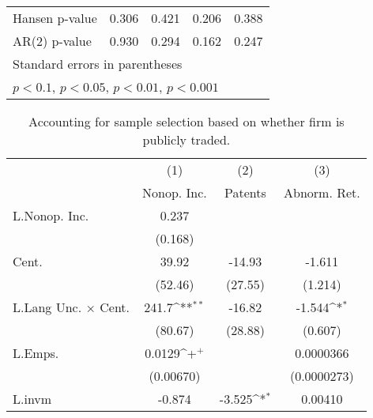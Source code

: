 \begin{table}
\begin{center}
{\begin{tabular}{l*{4}{c}}
Hansen p-value             &       0.306         &       0.421         &       0.206         &       0.388         \\
AR(2) p-value                &       0.930         &       0.294         &       0.162         &       0.247         \\
\hline\hline
\multicolumn{5}{l}{\footnotesize Standard errors in parentheses}\\
\multicolumn{5}{l}{\footnotesize \sym{+} \(p<0.1\), \sym{*} \(p<0.05\), \sym{**} \(p<0.01\), \sym{***} \(p<0.001\)}\\
\end{tabular}
}

\end{center}
\end{table}

\begin{table}
\begin{center}
\caption[Sample Selection on Public]{Accounting for sample selection based on whether firm is publicly traded.\label{sel2}}
\vspace{0.3in}
{
\def\sym#1{\ifmmode^{#1}\else\(^{#1}\)\fi}
\begin{tabular}{l*{3}{c}}
\hline\hline
                    &\multicolumn{1}{c}{(1)}&\multicolumn{1}{c}{(2)}&\multicolumn{1}{c}{(3)}\\
                    &\multicolumn{1}{c}{Nonop. Inc.}&\multicolumn{1}{c}{Patents}&\multicolumn{1}{c}{Abnorm. Ret.}\\
\hline
L.Nonop. Inc.       &       0.237         &                     &                     \\
                    &     (0.168)         &                     &                     \\
Cent.               &       39.92         &      -14.93         &      -1.611         \\
                    &     (52.46)         &     (27.55)         &     (1.214)         \\
L.Lang Unc. $\times$ Cent.&       241.7\sym{**} &      -16.82         &      -1.544\sym{*}  \\
                    &     (80.67)         &     (28.88)         &     (0.607)         \\
L.Emps.             &      0.0129\sym{+}  &                     &   0.0000366         \\
                    &   (0.00670)         &                     & (0.0000273)         \\
L.invm              &      -0.874         &      -3.525\sym{*}  &     0.00410         \\

\end{tabular}}
\end{center}
\end{table}
